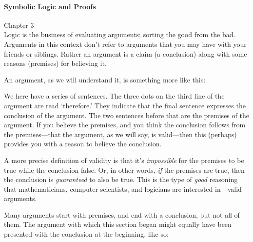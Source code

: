 \documentclass[11pt]{article} %
\begin{document}
	\paragraph{Symbolic Logic and Proofs} Chapter 3\\
	Logic is the business of evaluating arguments; sorting the good from the bad. Arguments in this context don't refer to arguments that you may have with your friends or siblings. Rather an argument is a claim (a conclusion) along with some reasons (premises) for believing it. 
	
	An argument, as we will understand it, is something more like this: \\
	
	\vspace{5mm}
	
	We here have a series of sentences. The three dots on the third line of the argument are read ‘therefore.’ They indicate that the final sentence expresses the conclusion of the argument. The two sentences before that are the premises of the argument. If you believe the premises, and you think the conclusion follows from the premises—that the argument, as we will say, is valid—then this (perhaps) provides you with a reason to believe the conclusion.
	
	A more precise definition of validity is that it's \textit{impossible} for the premises to be true while the conclusion false. Or, in other words, \textit{if} the premises are true, then the conclusion is \textit{guaranteed} to also be true. This is the type of \textit{good} reasoning that mathematicians, computer scientists, and logicians are interested in---valid arguments.
	
	Many arguments start with premises, and end with a conclusion, but not all of them. The argument with which this section began might equally have been presented with the conclusion at the beginning, like so:	\\
	
	\vspace{5mm}
	
\end{document}
